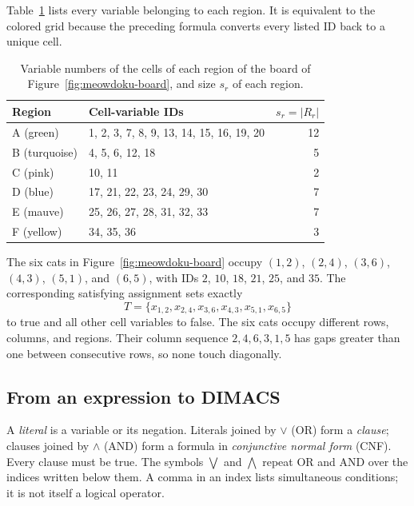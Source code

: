 Table~\ref{tab:q1-regions} lists every variable belonging to each region. It is equivalent to the colored grid because the preceding formula converts every listed ID back to a unique cell.
\begin{table}[H]
\centering
\begin{tabular}{@{}lp{9cm}r@{}}
\toprule
Region & Cell-variable IDs & $s_r=|R_r|$\\
\midrule
A (green) & 1, 2, 3, 7, 8, 9, 13, 14, 15, 16, 19, 20 & 12\\
B (turquoise) & 4, 5, 6, 12, 18 & 5\\
C (pink) & 10, 11 & 2\\
D (blue) & 17, 21, 22, 23, 24, 29, 30 & 7\\
E (mauve) & 25, 26, 27, 28, 31, 32, 33 & 7\\
F (yellow) & 34, 35, 36 & 3\\
\bottomrule
\end{tabular}
\caption{Variable numbers of the cells of each region of the board of Figure~\ref{fig:meowdoku-board}, and size $s_r$ of each region.}
\label{tab:q1-regions}
\end{table}

The six cats in Figure~\ref{fig:meowdoku-board} occupy $(1,2)$, $(2,4)$, $(3,6)$, $(4,3)$, $(5,1)$, and $(6,5)$, with IDs $2$, $10$, $18$, $21$, $25$, and $35$. The corresponding satisfying assignment sets exactly
\[
T=\{x_{1,2},x_{2,4},x_{3,6},x_{4,3},x_{5,1},x_{6,5}\}
\]
to true and all other cell variables to false. The six cats occupy different rows, columns, and regions. Their column sequence $2,4,6,3,1,5$ has gaps greater than one between consecutive rows, so none touch diagonally.

\subsection{From an expression to DIMACS}

A \emph{literal} is a variable or its negation. Literals joined by $\lor$ (OR) form a \emph{clause}; clauses joined by $\land$ (AND) form a formula in \emph{conjunctive normal form} (CNF). Every clause must be true. The symbols $\bigvee$ and $\bigwedge$ repeat OR and AND over the indices written below them. A comma in an index lists simultaneous conditions; it is not itself a logical operator.

